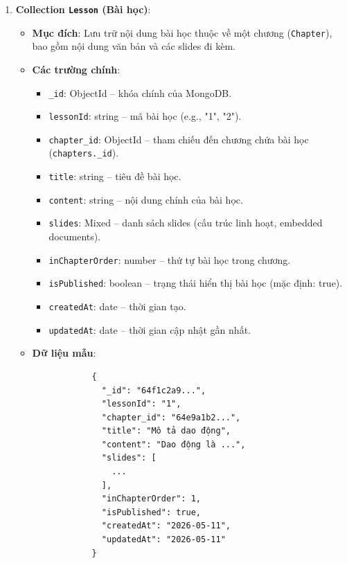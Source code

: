 \begin{enumerate}
\begin{itemize}
    \end{itemize}

    \item \textbf{Collection \texttt{Lesson} (Bài học)}:
        \begin{itemize}
            \item \textbf{Mục đích}: Lưu trữ nội dung bài học thuộc về một chương (\texttt{Chapter}), bao gồm nội dung văn bản và các slides đi kèm.
        
            \item \textbf{Các trường chính}:
            \begin{itemize}
                \item \texttt{\_id}: ObjectId – khóa chính của MongoDB.
                \item \texttt{lessonId}: string – mã bài học (e.g., "1", "2").
                \item \texttt{chapter\_id}: ObjectId – tham chiếu đến chương chứa bài học (\texttt{chapters.\_id}).
                \item \texttt{title}: string – tiêu đề bài học.
                \item \texttt{content}: string – nội dung chính của bài học.
                \item \texttt{slides}: Mixed – danh sách slides (cấu trúc linh hoạt, embedded documents).
                \item \texttt{inChapterOrder}: number – thứ tự bài học trong chương.
                \item \texttt{isPublished}: boolean – trạng thái hiển thị bài học (mặc định: true).
                \item \texttt{createdAt}: date – thời gian tạo.
                \item \texttt{updatedAt}: date – thời gian cập nhật gần nhất.
            \end{itemize}
        
            \item \textbf{Dữ liệu mẫu}:
            \begin{verbatim}
            {
              "_id": "64f1c2a9...",
              "lessonId": "1",
              "chapter_id": "64e9a1b2...",
              "title": "Mô tả dao động",
              "content": "Dao động là ...",
              "slides": [
                ...
              ],
              "inChapterOrder": 1,
              "isPublished": true,
              "createdAt": "2026-05-11",
              "updatedAt": "2026-05-11"
            }
            \end{verbatim}
        \end{itemize}


\end{enumerate}
